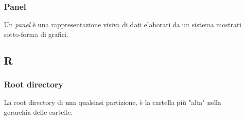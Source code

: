 	\subsubsection*{Panel} 
	\label{sec:panel}
Un \emph{panel} è una rappresentazione visiva di dati elaborati da un sistema mostrati sotto-forma di grafici.


\subsection*{R}

	\subsubsection*{Root directory}
	\label{sec:rootdirectory}
La root directory di una qualsiasi partizione, è la cartella più "alta" nella gerarchia delle cartelle.




